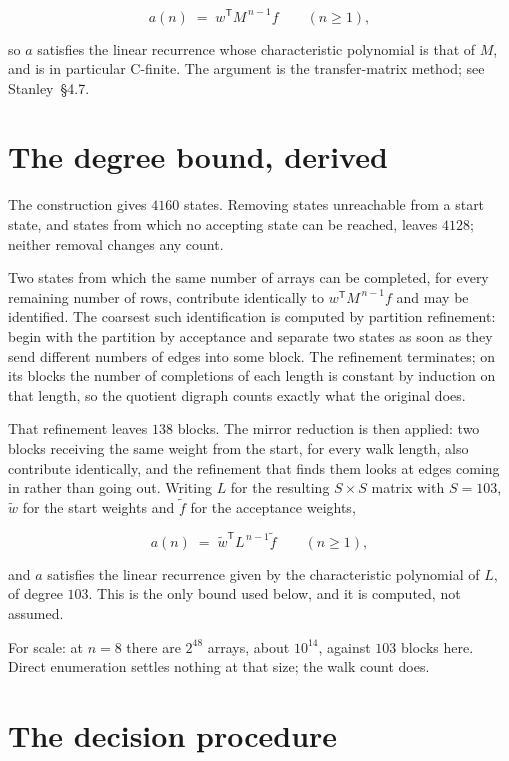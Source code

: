 \documentclass[11pt]{article}
\theoremstyle{definition}
\begin{document}
\[a(n) \;=\; w^{\mathsf T} M^{\,n-1} f \qquad (n \ge 1),\]

so $a$ satisfies the linear recurrence whose characteristic polynomial is that of $M$, and is in particular C-finite. The argument is the transfer-matrix method; see Stanley~\S4.7.

\section{The degree bound, derived}

The construction gives $4160$ states. Removing states unreachable from a start state, and states from which no accepting state can be reached, leaves $4128$; neither removal changes any count.

Two states from which the same number of arrays can be completed, for every remaining number of rows, contribute identically to $w^{\mathsf T}M^{\,n-1}f$ and may be identified. The coarsest such identification is computed by partition refinement: begin with the partition by acceptance and separate two states as soon as they send different numbers of edges into some block. The refinement terminates; on its blocks the number of completions of each length is constant by induction on that length, so the quotient digraph counts exactly what the original does.

That refinement leaves $138$ blocks. The mirror reduction is then applied: two blocks receiving the same weight from the start, for every walk length, also contribute identically, and the refinement that finds them looks at edges coming in rather than going out. Writing $L$ for the resulting $S \times S$ matrix with $S = 103$, $\tilde w$ for the start weights and $\tilde f$ for the acceptance weights,

\[a(n) \;=\; \tilde w^{\mathsf T} L^{\,n-1} \tilde f \qquad (n \ge 1),\]

and $a$ satisfies the linear recurrence given by the characteristic polynomial of $L$, of degree $103$. This is the only bound used below, and it is computed, not assumed.

For scale: at $n = 8$ there are $2^{48}$ arrays, about $10^{14}$, against $103$ blocks here. Direct enumeration settles nothing at that size; the walk count does.

\section{The decision procedure}
\end{document}
